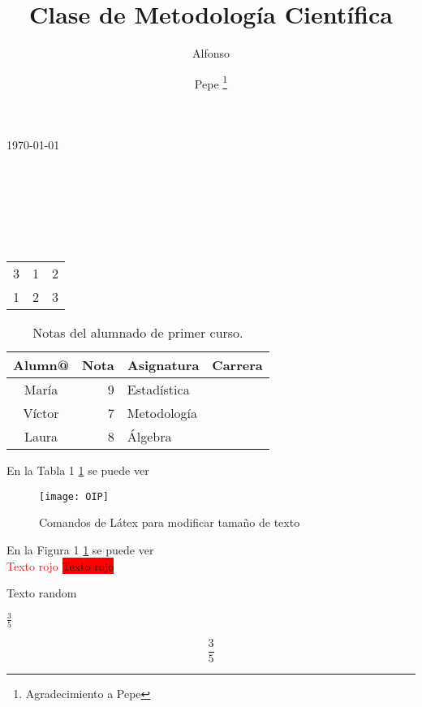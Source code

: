\documentclass[a4paper, 10pt]{article}
\title{Clase de Metodología Científica} %
\author{Alfonso \and Pepe \thanks{Agradecimiento a Pepe}}
\begin{document}
	\tableofcontents
	\listoffigures
	\listoftables
	\maketitle
	\noindent\today \\
	\lipsum[1] \\ \\
	\lipsum[2] \\ \\ \\ \\
	
	\begin{table}[h]
		\label{Tabla 1}
		\begin{center}
			\begin{tabular}{c|cc}
				3 & 1 & 2 \\
				1 & 2 & 3 \\
			\end{tabular}
		\end{center}
	\end{table}

	\begin{table}[h]
		\begin{center}
			\begin{tabular}{c|r|l|c} %
				 Alumn@ & Nota & Asignatura & Carrera \\ \hline \hline %
				 María & 9 & Estadística & \\
				 Víctor & 7 & Metodología & \\
				 Laura & 8 & Álgebra & \\ \hline
			\end{tabular}
			\caption{Notas del alumnado de primer curso.}
		\end{center}
	\end{table}
	En la Tabla 1 \ref{Tabla 1} se puede ver 
	
	\begin{figure}
		\label{Figura 1}
		\begin{center}
			\texttt{[image: OIP]} %
		\caption{Comandos de Látex para modificar tamaño de texto}
		\end{center}
	\end{figure}
	En la Figura 1 \ref{Figura 1} se puede ver \\
	\textcolor{red}{Texto rojo}
	\colorbox{red}{Texto rojo}
	
	\colorbox{color1}{Texto random}
	
	$\frac{3}{5}$
	
	$$\frac{3}{5}$$ %
	
\end{document}
